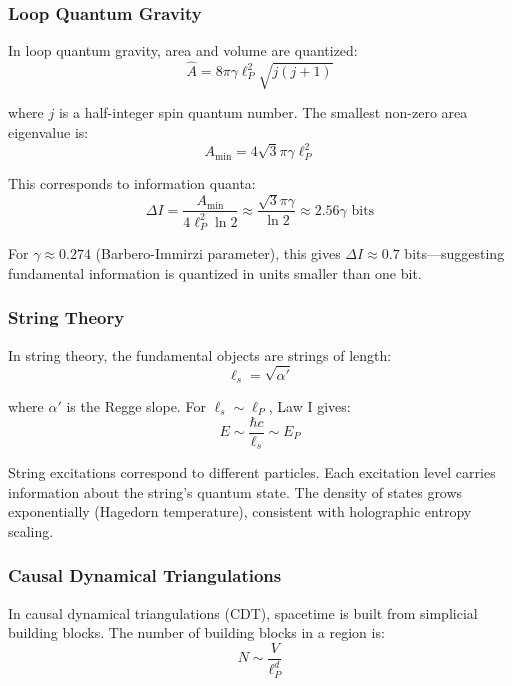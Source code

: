 \documentclass[11pt,a4paper]{article}
\theoremstyle{plain}
\theoremstyle{definition}
\theoremstyle{remark}
\begin{document}
\subsubsection{Loop Quantum Gravity}

In loop quantum gravity, area and volume are quantized:
\begin{equation}
\hat{A} = 8\pi\gamma\ell_P^2\sqrt{j(j+1)}
\end{equation}

where $j$ is a half-integer spin quantum number. The smallest non-zero area eigenvalue is:
\begin{equation}
A_{\min} = 4\sqrt{3}\pi\gamma\ell_P^2
\end{equation}

This corresponds to information quanta:
\begin{equation}
\Delta I = \frac{A_{\min}}{4\ell_P^2\ln 2} \approx \frac{\sqrt{3}\pi\gamma}{\ln 2} \approx 2.56\gamma\text{ bits}
\end{equation}

For $\gamma \approx 0.274$ (Barbero-Immirzi parameter), this gives $\Delta I \approx 0.7$ bits—suggesting fundamental information is quantized in units smaller than one bit.

\subsubsection{String Theory}

In string theory, the fundamental objects are strings of length:
\begin{equation}
\ell_s = \sqrt{\alpha'}
\end{equation}

where $\alpha'$ is the Regge slope. For $\ell_s \sim \ell_P$, Law I gives:
\begin{equation}
E \sim \frac{\hbar c}{\ell_s} \sim E_P
\end{equation}

String excitations correspond to different particles. Each excitation level carries information about the string's quantum state. The density of states grows exponentially (Hagedorn temperature), consistent with holographic entropy scaling.

\subsubsection{Causal Dynamical Triangulations}

In causal dynamical triangulations (CDT), spacetime is built from simplicial building blocks. The number of building blocks in a region is:
\begin{equation}
N \sim \frac{V}{\ell_P^d}
\end{equation}
\end{document}
